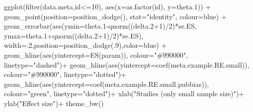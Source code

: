\documentclass[
]{book}
\newenvironment{Shaded}{\begin{snugshade}}{\end{snugshade}}
\newcommand{\AttributeTok}[1]{\textcolor[rgb]{0.77,0.63,0.00}{#1}}
\newcommand{\DecValTok}[1]{\textcolor[rgb]{0.00,0.00,0.81}{#1}}
\newcommand{\FloatTok}[1]{\textcolor[rgb]{0.00,0.00,0.81}{#1}}
\newcommand{\FunctionTok}[1]{\textcolor[rgb]{0.00,0.00,0.00}{#1}}
\newcommand{\NormalTok}[1]{#1}
\newcommand{\SpecialCharTok}[1]{\textcolor[rgb]{0.00,0.00,0.00}{#1}}
\newcommand{\StringTok}[1]{\textcolor[rgb]{0.31,0.60,0.02}{#1}}
\theoremstyle{definition}
\theoremstyle{definition}
\theoremstyle{definition}
\theoremstyle{definition}
\theoremstyle{remark}
\begin{document}
\begin{Shaded}
\begin{Highlighting}[]
  \FunctionTok{ggplot}\NormalTok{(}\FunctionTok{filter}\NormalTok{(data.meta,id}\SpecialCharTok{\textless{}=}\DecValTok{10}\NormalTok{), }\FunctionTok{aes}\NormalTok{(}\AttributeTok{x=}\FunctionTok{as.factor}\NormalTok{(id), }\AttributeTok{y=}\NormalTok{theta}\FloatTok{.1}\NormalTok{)) }\SpecialCharTok{+}
      \FunctionTok{geom\_point}\NormalTok{(}\AttributeTok{position=}\FunctionTok{position\_dodge}\NormalTok{(), }\AttributeTok{stat=}\StringTok{"identity"}\NormalTok{, }\AttributeTok{colour=}\StringTok{\textquotesingle{}blue\textquotesingle{}}\NormalTok{) }\SpecialCharTok{+}
      \FunctionTok{geom\_errorbar}\NormalTok{(}\FunctionTok{aes}\NormalTok{(}\AttributeTok{ymin=}\NormalTok{theta}\FloatTok{.1}\SpecialCharTok{{-}}\FunctionTok{qnorm}\NormalTok{((delta}\FloatTok{.2}\SpecialCharTok{+}\DecValTok{1}\NormalTok{)}\SpecialCharTok{/}\DecValTok{2}\NormalTok{)}\SpecialCharTok{*}\NormalTok{se.ES, }\AttributeTok{ymax=}\NormalTok{theta}\FloatTok{.1}\SpecialCharTok{+}\FunctionTok{qnorm}\NormalTok{((delta}\FloatTok{.2}\SpecialCharTok{+}\DecValTok{1}\NormalTok{)}\SpecialCharTok{/}\DecValTok{2}\NormalTok{)}\SpecialCharTok{*}\NormalTok{se.ES), }\AttributeTok{width=}\NormalTok{.}\DecValTok{2}\NormalTok{,}\AttributeTok{position=}\FunctionTok{position\_dodge}\NormalTok{(.}\DecValTok{9}\NormalTok{),}\AttributeTok{color=}\StringTok{\textquotesingle{}blue\textquotesingle{}}\NormalTok{) }\SpecialCharTok{+}
      \FunctionTok{geom\_hline}\NormalTok{(}\FunctionTok{aes}\NormalTok{(}\AttributeTok{yintercept=}\FunctionTok{ES}\NormalTok{(param)), }\AttributeTok{colour=}\StringTok{"\#990000"}\NormalTok{, }\AttributeTok{linetype=}\StringTok{"dashed"}\NormalTok{)}\SpecialCharTok{+}
      \FunctionTok{geom\_hline}\NormalTok{(}\FunctionTok{aes}\NormalTok{(}\AttributeTok{yintercept=}\FunctionTok{coef}\NormalTok{(meta.example.RE.small)), }\AttributeTok{colour=}\StringTok{"\#990000"}\NormalTok{, }\AttributeTok{linetype=}\StringTok{"dotted"}\NormalTok{)}\SpecialCharTok{+}
      \FunctionTok{geom\_hline}\NormalTok{(}\FunctionTok{aes}\NormalTok{(}\AttributeTok{yintercept=}\FunctionTok{coef}\NormalTok{(meta.example.RE.small.pubbias)), }\AttributeTok{colour=}\StringTok{"green"}\NormalTok{, }\AttributeTok{linetype=}\StringTok{"dotted"}\NormalTok{)}\SpecialCharTok{+}
      \FunctionTok{xlab}\NormalTok{(}\StringTok{"Studies (only small sample size)"}\NormalTok{)}\SpecialCharTok{+}
      \FunctionTok{ylab}\NormalTok{(}\StringTok{"Effect size"}\NormalTok{)}\SpecialCharTok{+}
      \FunctionTok{theme\_bw}\NormalTok{()}


\end{Highlighting}
\end{Shaded}
\end{document}
